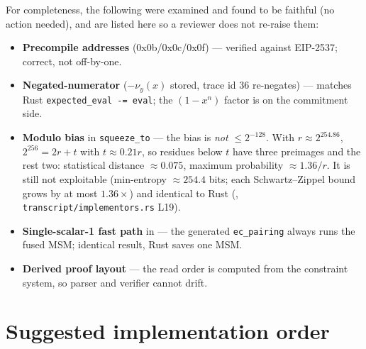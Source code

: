 For completeness, the following were examined and found to be faithful
(no action needed), and are listed here so a reviewer does not re-raise
them:
\begin{itemize}[leftmargin=1.4em,itemsep=1pt]
  \item \textbf{Precompile addresses} (0x0b/0x0c/0x0f) --- verified
        against EIP-2537; correct, not off-by-one.
  \item \textbf{Negated-numerator} ($-\nu_y(x)$ stored, trace id 36
        re-negates) --- matches Rust \texttt{expected\_\allowbreak{}eval -= eval};
        the $(1-x^n)$ factor is on the commitment side.
  \item \textbf{Modulo bias} in \texttt{squeeze\_to} ---
         the bias is \emph{not} $\le 2^{-128}$.
        With $r\approx 2^{254.86}$, $2^{256}=2r+t$ with $t\approx0.21r$,
        so residues below $t$ have three preimages and the rest two:
        statistical distance $\approx0.075$, maximum probability
        $\approx1.36/r$. It is still not exploitable (min-entropy
        $\approx254.4$ bits; each Schwartz--Zippel bound grows by at most
        $1.36\times$) and identical to Rust
        (,
        \texttt{transcript/\allowbreak{}implementors.rs} L19).
  \item \textbf{Single-scalar-1 fast path} in  ---
        the generated \texttt{ec\_pairing} always runs the fused MSM;
        identical result, Rust saves one MSM.
  \item \textbf{Derived proof layout} --- the read order is computed
        from the constraint system, so parser and verifier cannot drift.
\end{itemize}

\section{Suggested implementation order}
\label{sec:roadmap-order}

